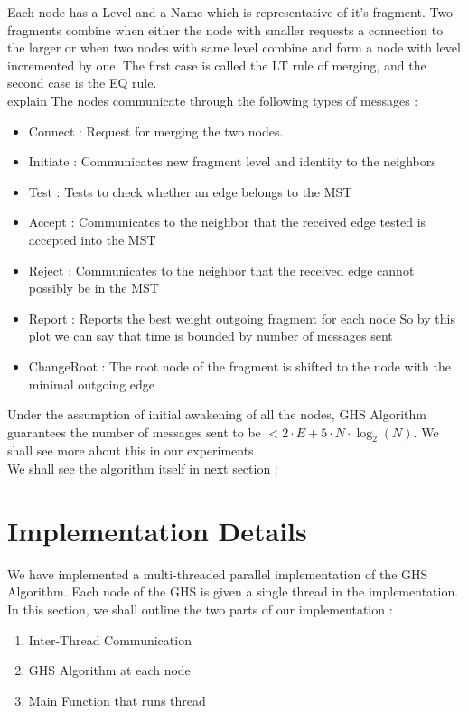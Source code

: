\documentclass[letterpaper,11pt]{article}
\begin{document}
 	Each node has a {\sc Level} and a {\sc Name} which is representative of it's fragment. Two fragments combine when either the node with smaller requests a connection to the larger or when two nodes with same level combine and form a node with level incremented by one. The first case is called the LT rule of merging, and the second case is the EQ rule. \\
 	explain
 	The nodes communicate through the following types of messages : 
 	\begin{itemize}
 		\item {\sc Connect} : Request for merging the two nodes.
 		\item {\sc Initiate} : Communicates new fragment level and identity to the neighbors
 		\item {\sc Test} : Tests to check whether an edge belongs to the MST
 		\item {\sc Accept} : Communicates to the neighbor that the received edge tested is accepted into the MST
 		\item {\sc Reject} : Communicates to the neighbor that the received edge cannot possibly be in the MST
 		\item {\sc Report} : Reports the best weight outgoing fragment for each node So by this plot we can say that time is bounded by number of messages sent
 		\item {\sc ChangeRoot} : The root node of the fragment is shifted to the node with the minimal outgoing edge
 	\end{itemize}
 
 	Under the assumption of initial awakening of all the nodes, GHS Algorithm guarantees the number of messages sent to be $< 2\cdot E + 5 \cdot N \cdot \log_2(N)$. We shall see more about this in our experiments \\
	
	We shall see the algorithm itself in next section :
	
	\section{Implementation Details}
	
	We have implemented a multi-threaded parallel implementation of the GHS Algorithm. Each node of the GHS is given a single thread in the implementation. \\ 
	
	In this section, we shall outline the two parts of our implementation : 
	\begin{enumerate}
		\item Inter-Thread Communication 
		\item GHS Algorithm at each node
		\item Main Function that runs thread
	\end{enumerate}
	
\end{document}
